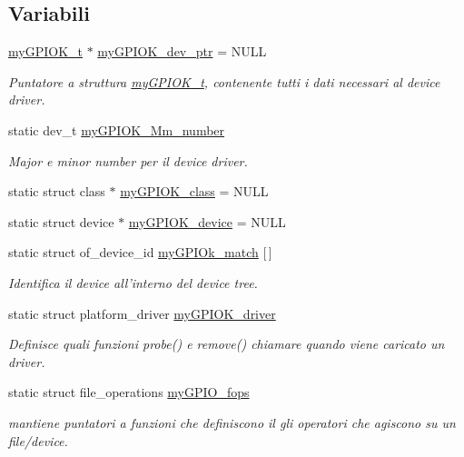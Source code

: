 \subsection*{Variabili}
\begin{DoxyCompactItemize}
\item 
\hyperlink{structmy_g_p_i_o_k__t}{my\+G\+P\+I\+O\+K\+\_\+t} $\ast$ \hyperlink{group___linux-_driver_gae370dfc26b06b6cc24a7bcc152f4969e}{my\+G\+P\+I\+O\+K\+\_\+dev\+\_\+ptr} = N\+U\+L\+L
\begin{DoxyCompactList}\small\item\em Puntatore a struttura \hyperlink{structmy_g_p_i_o_k__t}{my\+G\+P\+I\+O\+K\+\_\+t}, contenente tutti i dati necessari al device driver. \end{DoxyCompactList}\item 
static dev\+\_\+t \hyperlink{group___linux-_driver_ga434e034e4625b1949f0c626823870a39}{my\+G\+P\+I\+O\+K\+\_\+\+Mm\+\_\+number}
\begin{DoxyCompactList}\small\item\em Major e minor number per il device driver. \end{DoxyCompactList}\item 
static struct class $\ast$ \hyperlink{group___linux-_driver_gaaf8d1bce7d6389684a037e94381c275c}{my\+G\+P\+I\+O\+K\+\_\+class} = N\+U\+L\+L
\item 
static struct device $\ast$ \hyperlink{group___linux-_driver_ga2d345c792760e3103059b6b6e0bfdaee}{my\+G\+P\+I\+O\+K\+\_\+device} = N\+U\+L\+L
\item 
static struct of\+\_\+device\+\_\+id \hyperlink{group___linux-_driver_ga91f28437e0a553effa546d16fa44f03a}{my\+G\+P\+I\+Ok\+\_\+match} \mbox{[}$\,$\mbox{]}
\begin{DoxyCompactList}\small\item\em Identifica il device all'interno del device tree. \end{DoxyCompactList}\item 
static struct platform\+\_\+driver \hyperlink{group___linux-_driver_ga8dba1541b58fa63f8208232ffce4fc47}{my\+G\+P\+I\+O\+K\+\_\+driver}
\begin{DoxyCompactList}\small\item\em Definisce quali funzioni probe() e remove() chiamare quando viene caricato un driver. \end{DoxyCompactList}\item 
static struct file\+\_\+operations \hyperlink{group___linux-_driver_ga9f31111fdb3b4a5944e18d45045e0f01}{my\+G\+P\+I\+O\+\_\+fops}
\begin{DoxyCompactList}\small\item\em mantiene puntatori a funzioni che definiscono il gli operatori che agiscono su un file/device. \end{DoxyCompactList}\end{DoxyCompactItemize}


